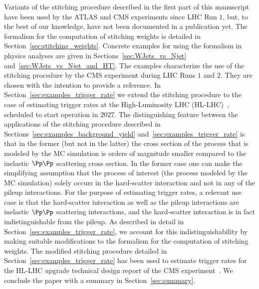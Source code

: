 Variants of the stitching procedure described in the first part of this manuscript have been used by the ATLAS and CMS experiments since LHC Run $1$,
but, to the best of our knowledge, have not been documented in a publication yet.
The formalism for the computation of stitching weights is detailed in Section~\ref{sec:stitching_weights}.
Concrete examples for using the formalism in physics analyses are given in Sections~\ref{sec:WJets_vs_Njet} and~\ref{sec:WJets_vs_Njet_and_HT}.
The examples characterize the use of the stitching procedure by the CMS experiment during LHC Runs $1$ and $2$.
They are chosen with the intention to provide a reference.
In Section~\ref{sec:examples_trigger_rate} we extend the stitching procedure to the case of estimating trigger rates at the High-Luminosity LHC (HL-LHC)~\cite{TDR_Phase2_LHC},
scheduled to start operation in $2027$.
The distinguishing feature between the applications of the stitching procedure described in Sections~\ref{sec:examples_background_yield} and~\ref{sec:examples_trigger_rate}
is that in the former (but not in the latter) the cross section of the process that is modeled by the MC simulation
is orders of magnitude smaller compared to the inelastic $\Pp\Pp$ scattering cross section.
In the former case one can make the simplifying assumption that the process of interest (the process modeled by the MC simulation) 
solely occurs in the hard-scatter interaction and not in any of the pileup interactions.
For the purpose of estimating trigger rates, a relevant use case is that the hard-scatter interaction as well as the pileup interactions are inelastic $\Pp\Pp$ scattering interactions,
and the hard-scatter interaction is in fact indistinguishable from the pileup.
As described in detail in Section~\ref{sec:examples_trigger_rate},
we account for this indistinguishability by making suitable modifications to the formalism for the computation of stitching weights.
The modified stitching procedure detailed in Section~\ref{sec:examples_trigger_rate} has been used to estimate trigger rates 
for the HL-LHC upgrade technical design report of the CMS experiment~\cite{TDR-21-001}.
We conclude the paper with a summary in Section~\ref{sec:summary}.
